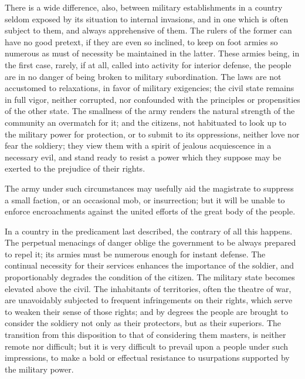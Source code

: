 There is a wide difference, also, between military establishments in a country seldom exposed by its situation to internal invasions, and in one which is often subject to them, and always apprehensive of them. The rulers of the former can have no good pretext, if they are even so inclined, to keep on foot armies so numerous as must of necessity be maintained in the latter. These armies being, in the first case, rarely, if at all, called into activity for interior defense, the people are in no danger of being broken to military subordination. The laws are not accustomed to relaxations, in favor of military exigencies; the civil state remains in full vigor, neither corrupted, nor confounded with the principles or propensities of the other state. The smallness of the army renders the natural strength of the community an overmatch for it; and the citizens, not habituated to look up to the military power for protection, or to submit to its oppressions, neither love nor fear the soldiery; they view them with a spirit of jealous acquiescence in a necessary evil, and stand ready to resist a power which they suppose may be exerted to the prejudice of their rights.

The army under such circumstances may usefully aid the magistrate to suppress a small faction, or an occasional mob, or insurrection; but it will be unable to enforce encroachments against the united efforts of the great body of the people.

In a country in the predicament last described, the contrary of all this happens. The perpetual menacings of danger oblige the government to be always prepared to repel it; its armies must be numerous enough for instant defense. The continual necessity for their services enhances the importance of the soldier, and proportionably degrades the condition of the citizen. The military state becomes elevated above the civil. The inhabitants of territories, often the theatre of war, are unavoidably subjected to frequent infringements on their rights, which serve to weaken their sense of those rights; and by degrees the people are brought to consider the soldiery not only as their protectors, but as their superiors. The transition from this disposition to that of considering them masters, is neither remote nor difficult; but it is very difficult to prevail upon a people under such impressions, to make a bold or effectual resistance to usurpations supported by the military power.

